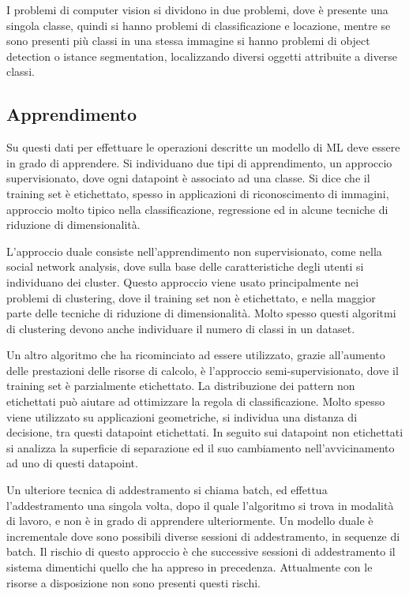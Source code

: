 \documentclass{article}
\numberwithin{equation}{subsection}
\begin{document}
I problemi di computer vision si dividono in due problemi, dove è presente una singola 
classe, quindi si hanno problemi di classificazione e locazione, mentre se sono presenti più classi in una stessa immagine si hanno problemi di object detection o istance segmentation, localizzando diversi oggetti attribuite a diverse classi. 

\subsection{Apprendimento}

Su questi dati per effettuare le operazioni descritte un modello di ML deve essere in grado di apprendere. Si individuano due tipi di apprendimento, un approccio supervisionato, dove ogni datapoint è associato ad una classe. 
Si dice che il training set è etichettato, spesso in applicazioni di riconoscimento di immagini, approccio molto tipico nella classificazione, regressione ed in alcune 
tecniche di riduzione di dimensionalità. 

L'approccio duale consiste nell'apprendimento non supervisionato, come nella social 
network analysis, dove sulla base delle caratteristiche degli utenti si individuano dei cluster. 
Questo approccio viene usato principalmente nei problemi di clustering, dove il training 
set non è etichettato, e nella maggior parte delle tecniche di riduzione di dimensionalità. 
Molto spesso questi algoritmi di clustering devono anche individuare il numero di classi in 
un dataset. 

Un altro algoritmo che ha ricominciato ad essere utilizzato, grazie all'aumento delle prestazioni 
delle risorse di calcolo, è l'approccio semi-supervisionato, dove il training set è 
parzialmente etichettato. La distribuzione dei pattern non etichettati può aiutare ad ottimizzare la 
regola di classificazione. 
Molto spesso viene utilizzato su applicazioni geometriche, si individua una distanza di decisione, 
tra questi datapoint etichettati. In seguito sui datapoint non etichettati si analizza la 
superficie di separazione ed il suo cambiamento nell'avvicinamento ad uno di questi datapoint. 


Un ulteriore tecnica di addestramento si chiama batch, ed effettua l'addestramento una 
singola volta, dopo il quale l'algoritmo si trova in modalità di lavoro, e non è in grado di 
apprendere ulteriormente. 
Un modello duale è incrementale dove sono possibili diverse sessioni di addestramento, in 
sequenze di batch. Il rischio di questo approccio è che successive sessioni di addestramento 
il sistema dimentichi quello che ha appreso in precedenza. Attualmente con le risorse a disposizione 
non sono presenti questi rischi. 
\end{document}
